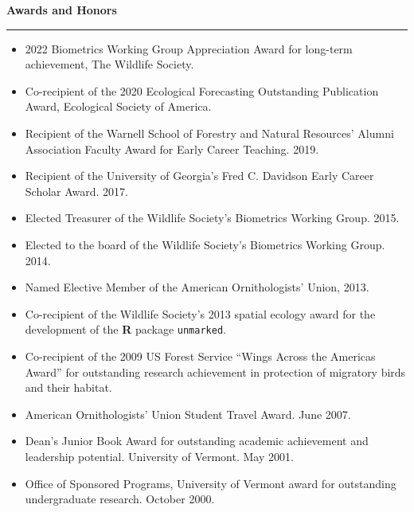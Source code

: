 \vspace{0.5cm}



{\large \bf Awards and Honors} \\
\rule[3mm]{\textwidth}{0.3mm}

\begin{itemize}

\item 2022 Biometrics Working Group Appreciation Award for long-term
  achievement, The Wildlife Society.
  
\item Co-recipient of the 2020 Ecological Forecasting Outstanding
  Publication Award, Ecological Society of America. 
  
\item Recipient of the Warnell School of Forestry and Natural
  Resources' Alumni Association Faculty Award for Early Career
  Teaching. 2019. 
  
\item Recipient of the University of Georgia's Fred C. Davidson Early
  Career Scholar Award. 2017. 

\item Elected Treasurer of the Wildlife Society's Biometrics Working
  Group. 2015. 

\item Elected to the board of the Wildlife Society's Biometrics
  Working Group. 2014. 

\item Named Elective Member of the American Ornithologists' Union,
  2013. 

\item Co-recipient of the Wildlife Society's 2013 spatial ecology award for
  the development of the {\bf R} package {\tt unmarked}.

\item Co-recipient of the 2009 US Forest Service ``Wings Across the Americas Award''
for outstanding research achievement in protection of
migratory birds and their habitat.

\item American Ornithologists' Union Student Travel Award. June 2007.

\item Dean's Junior Book Award for outstanding academic achievement
  and leadership potential. University of Vermont. May 2001.

\item Office of Sponsored Programs, University of Vermont award for
  outstanding undergraduate research. October 2000.

\end{itemize}


